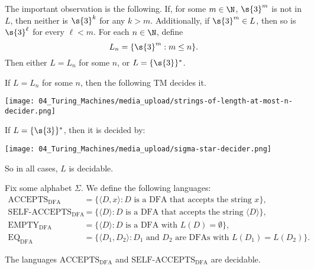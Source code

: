 \begin{solution}
\label{sol:Turing-Machines::observation}
The important observation is the following. If, for some $m \in \N$, $\s{3}^m$ is not in $L$, then neither is $\s{3}^{k}$ for any $k > m$. Additionally, if $\s{3}^m \in L$, then so is $\s{3}^{\ell}$ for every $\ell < m$. For each $n \in \N$, define 
\[
L_n = \{\s{3}^m : m \leq n\}.
\]
Then either $L = L_n$ for some $n$, or $L = \{\s{3}\}^*$.

If $L = L_n$ for some $n$, then the following TM decides it.
\begin{center}
    \texttt{[image: 04\_Turing\_Machines/media\_upload/strings-of-length-at-most-n-decider.png]}
\end{center}

If $L = \{\s{3}\}^*$, then it is decided by:
\begin{center}
    \texttt{[image: 04\_Turing\_Machines/media\_upload/sigma-star-decider.png]}
\end{center}
So in all cases, $L$ is decidable.

\end{solution}

\begin{definition}
\label{definition:Languages-related-to-encodings-of-DFAs}
Fix some alphabet $\Sigma$. We define the following languages:
\[ \begin{align*}
    \text{ACCEPTS}_\text{DFA} & = \{\langle D,x \rangle : \text{$D$ is a DFA that accepts the string $x$}\}, \\
    \text{SELF-ACCEPTS}_\text{DFA} & = \{\langle D \rangle : \text{$D$ is a DFA that accepts the string $\langle D \rangle$}\}, \\
    \text{EMPTY}_\text{DFA} & = \{\langle D \rangle : \text{$D$ is a DFA with $L(D) = \emptyset$} \}, \\
    \text{EQ}_\text{DFA} & = \{ \langle D_1,D_2 \rangle : \text{$D_1$ and $D_2$ are DFAs with $L(D_1) = L(D_2)$} \}.
\end{align*} \]

\end{definition}

\begin{theorem}
\label{theorem:textACCEPTS-textDFA-and-textSELF-ACCEPTS_textDFA-are-decidable}
The languages $\mathrm{ACCEPTS}_\mathrm{DFA}$ and $\mathrm{SELF}$-$\mathrm{ACCEPTS}_\mathrm{DFA}$ are decidable.

\end{theorem}


